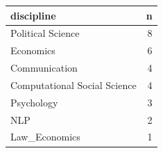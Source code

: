 \begin{tabular}{lr}
\toprule
discipline & n \\
\midrule
Political Science & 8 \\
Economics & 6 \\
Communication & 4 \\
Computational Social Science & 4 \\
Psychology & 3 \\
NLP & 2 \\
Law\_Economics & 1 \\
\bottomrule
\end{tabular}
